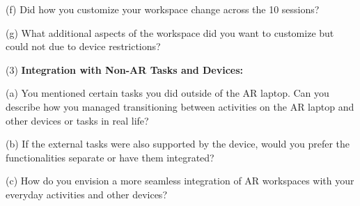 \quad (f) Did how you customize your workspace change across the 10 sessions? 

\quad (g) What additional aspects of the workspace did you want to customize but could not due to device restrictions?


(3) \textbf{Integration with Non-AR Tasks and Devices:
}

\quad (a) You mentioned certain tasks you did outside of the AR laptop. Can you describe how you managed transitioning between activities on the AR laptop and other devices or tasks in real life?

(b) If the external tasks were also supported by the device, would you prefer the functionalities separate or have them integrated?

(c) How do you envision a more seamless integration of AR workspaces with your everyday activities and other devices?
